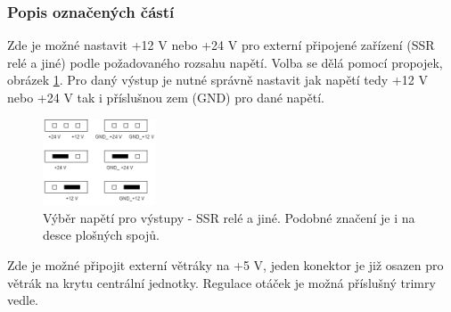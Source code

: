 
\begin{Czech}
\subsubsection{Popis označených částí}
\end{Czech}

\begin{Czech}
\end{Czech}

\begin{Czech}
Zde je možné nastavit +12 V nebo +24 V pro externí připojené zařízení (SSR relé a jiné) podle požadovaného rozsahu napětí. Volba se dělá pomocí propojek, obrázek \ref{fig:pin-header-relays}. Pro daný výstup je nutné správně nastavit jak napětí tedy +12 V nebo +24 V tak i příslušnou zem (GND) pro dané napětí.
\end{Czech}

\begin{Czech}
\begin{figure}[H]
    \centering
    \includegraphics[width=0.3\textwidth]{pictures/all/hardware/pin-header-relays.png}
    \caption{Výběr napětí pro výstupy - SSR relé a jiné. Podobné značení je i na desce plošných spojů.}
    \label{fig:pin-header-relays}
\end{figure}
\end{Czech}

\begin{Czech}
\end{Czech}

\begin{Czech}
Zde je možné připojit externí větráky na +5 V, jeden konektor je již osazen pro větrák na krytu centrální jednotky. Regulace otáček je možná příslušný trimry vedle.
\end{Czech}

\begin{Czech}
\end{Czech}

